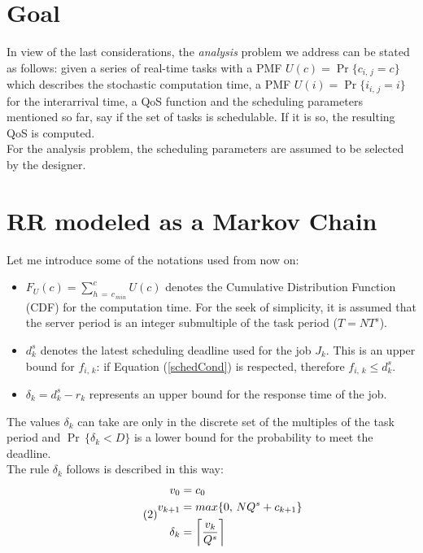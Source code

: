 \section{Goal}
In view of the last considerations, the \emph{analysis} problem we address can be stated as follows: given a series of real-time tasks with a PMF \( U(c) = \Pr\{c_{i,\,j} = c\} \) which describes the stochastic computation time, a PMF \( U(i) = \Pr\{i_{i,\,j} = i\} \) for the interarrival time, a QoS function and the scheduling parameters mentioned so far, say if the set of tasks is schedulable. If it is so, the resulting QoS is computed.\\
For the analysis problem, the scheduling parameters are assumed to be selected by the designer.

\section{RR modeled as a Markov Chain}
Let me introduce some of the notations used from now on:
\begin{itemize}
  \item \( F_{U}(c) = \displaystyle\sum_{h\,=\,c_{\,min}}^{c} U(c) \) denotes the Cumulative Distribution Function (CDF) for the computation time. For the seek of simplicity, it is assumed that the server period is an integer submultiple of the task period (\( T = NT^{s} \)).
  \item \( d_{k}^{s} \) denotes the latest scheduling deadline used for the job \( J_{k} \). This is an upper bound for \( f_{i,\,k} \): if Equation (\ref{schedCond}) is respected, therefore \( f_{i,\,k} \leq d_{k}^{s} \).
  \item \( \delta_{k} = d_{k}^{s} - r_{k} \) represents an upper bound for the response time of the job.
\end{itemize}

The values \( \delta_{k} \) can take are only in the discrete set of the multiples of the task period and \( \Pr\,\{\delta_{k} < D\} \) is a lower bound for the probability to meet the deadline.\\
The rule \( \delta_{k} \) follows is described in this way:
\begin{equation} \tag{2} \label{markovProcess}
\begin{split}
  v_{0} &= c_{0}\\
  v_{k+1} &= max\{0,\,NQ^{s} + c_{k+1}\}\\
  \delta_{k} &= \ceil[\bigg]{\frac{v_{k}}{Q^{s}}}
\end{split}
\end{equation}

